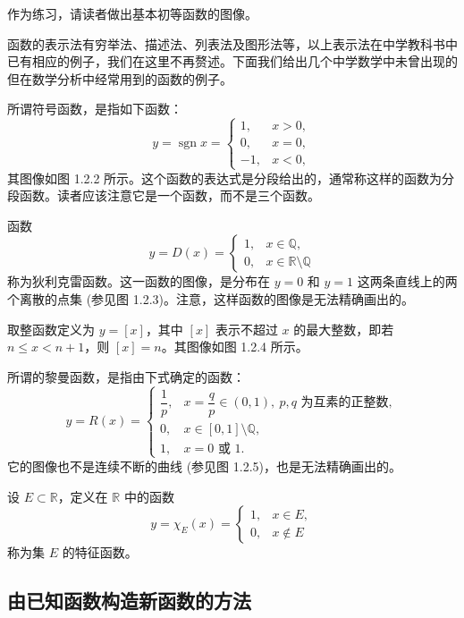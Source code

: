 \documentclass[UTF8,12pt,a4paper,fontset=fandol]{ctexbook}
\begin{document}
作为练习，请读者做出基本初等函数的图像。

函数的表示法有穷举法、描述法、列表法及图形法等，以上表示法在中学教科书中已有相应的例子，我们在这里不再赘述。下面我们给出几个中学数学中未曾出现的但在数学分析中经常用到的函数的例子。

\noindent{}\quad 所谓符号函数，是指如下函数：
\[
  y=\operatorname{sgn}x=
  \begin{cases}
    1, & x>0,\\
    0, & x=0,\\
    -1, & x<0,
  \end{cases}
\]
其图像如图 1.2.2 所示。这个函数的表达式是分段给出的，通常称这样的函数为分段函数。读者应该注意它是一个函数，而不是三个函数。

\noindent{}\quad 函数
\[
  y=D(x)=
  \begin{cases}
    1, & x\in\mathbb{Q},\\
    0, & x\in\mathbb{R}\setminus\mathbb{Q}
  \end{cases}
\]
称为狄利克雷函数。这一函数的图像，是分布在 $y=0$ 和 $y=1$ 这两条直线上的两个离散的点集 (参见图 1.2.3)。注意，这样函数的图像是无法精确画出的。

\noindent{}\quad 取整函数定义为 $y=[x]$，其中 $[x]$ 表示不超过 $x$ 的最大整数，即若 $n\leqslant x<n+1$，则 $[x]=n$。其图像如图 1.2.4 所示。

\noindent{}\quad 所谓的黎曼函数，是指由下式确定的函数：
\[
  y=R(x)=
  \begin{cases}
    \dfrac1p, & x=\dfrac qp\in(0,1),\ p,q\text{ 为互素的正整数},\\
    0, & x\in[0,1]\setminus\mathbb{Q},\\
    1, & x=0\text{ 或 }1.
  \end{cases}
\]
它的图像也不是连续不断的曲线 (参见图 1.2.5)，也是无法精确画出的。

\noindent{}\quad 设 $E\subset\mathbb{R}$，定义在 $\mathbb{R}$ 中的函数
\[
  y=\chi_E(x)=
  \begin{cases}
    1, & x\in E,\\
    0, & x\notin E
  \end{cases}
\]
称为集 $E$ 的特征函数。

\subsection{由已知函数构造新函数的方法}
\end{document}
